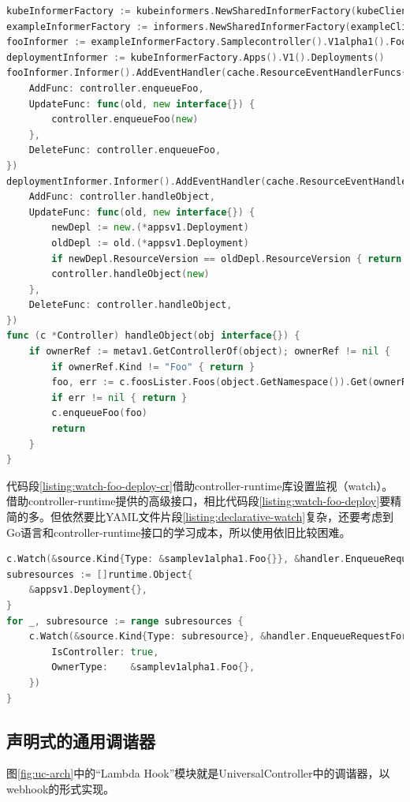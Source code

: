 \documentclass[macfonts,master]{njuthesis}
\begin{document}
\newpage

\begin{lstlisting}[language=Go,caption=sample-controller中监视Foo和Deployment的代码段,label=listing:watch-foo-deploy]
kubeInformerFactory := kubeinformers.NewSharedInformerFactory(kubeClient, time.Second*30)
exampleInformerFactory := informers.NewSharedInformerFactory(exampleClient, time.Second*30)
fooInformer := exampleInformerFactory.Samplecontroller().V1alpha1().Foos()
deploymentInformer := kubeInformerFactory.Apps().V1().Deployments()
fooInformer.Informer().AddEventHandler(cache.ResourceEventHandlerFuncs{
	AddFunc: controller.enqueueFoo,
	UpdateFunc: func(old, new interface{}) {
		controller.enqueueFoo(new)
	},
	DeleteFunc: controller.enqueueFoo,
})
deploymentInformer.Informer().AddEventHandler(cache.ResourceEventHandlerFuncs{
	AddFunc: controller.handleObject,
	UpdateFunc: func(old, new interface{}) {
		newDepl := new.(*appsv1.Deployment)
		oldDepl := old.(*appsv1.Deployment)
		if newDepl.ResourceVersion == oldDepl.ResourceVersion { return }
		controller.handleObject(new)
	},
	DeleteFunc: controller.handleObject,
})
func (c *Controller) handleObject(obj interface{}) {
	if ownerRef := metav1.GetControllerOf(object); ownerRef != nil {
		if ownerRef.Kind != "Foo" { return }
		foo, err := c.foosLister.Foos(object.GetNamespace()).Get(ownerRef.Name)
		if err != nil { return }
		c.enqueueFoo(foo)
		return
	}
}
\end{lstlisting}

代码段\ref{listing:watch-foo-deploy-cr}借助controller-runtime库设置监视（watch）。借助controller-runtime提供的高级接口，相比代码段\ref{listing:watch-foo-deploy}要精简的多。但依然要比YAML文件片段\ref{listing:declarative-watch}复杂，还要考虑到Go语言和controller-runtime接口的学习成本，所以使用依旧比较困难。

\begin{lstlisting}[language=Go,caption=controller-runtime版sample-controller中监视Foo和Deployment的代码段,label=listing:watch-foo-deploy-cr]
c.Watch(&source.Kind{Type: &samplev1alpha1.Foo{}}, &handler.EnqueueRequestForObject{})
subresources := []runtime.Object{
    &appsv1.Deployment{},
}
for _, subresource := range subresources {
    c.Watch(&source.Kind{Type: subresource}, &handler.EnqueueRequestForOwner{
        IsController: true,
        OwnerType:    &samplev1alpha1.Foo{},
    })
}
\end{lstlisting}


\subsection{声明式的通用调谐器}
图\ref{fig:uc-arch}中的``Lambda Hook''模块就是UniversalController中的调谐器，以webhook的形式实现。
\end{document}
